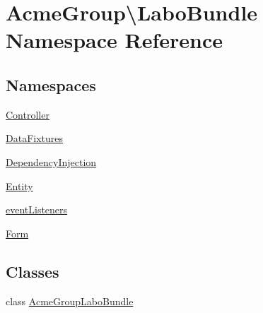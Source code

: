 \hypertarget{namespace_acme_group_1_1_labo_bundle}{\section{Acme\+Group\textbackslash{}Labo\+Bundle Namespace Reference}
\label{namespace_acme_group_1_1_labo_bundle}
}
\subsection*{Namespaces}
\begin{DoxyCompactItemize}
\item 
 \hyperlink{namespace_acme_group_1_1_labo_bundle_1_1_controller}{Controller}
\item 
 \hyperlink{namespace_acme_group_1_1_labo_bundle_1_1_data_fixtures}{Data\+Fixtures}
\item 
 \hyperlink{namespace_acme_group_1_1_labo_bundle_1_1_dependency_injection}{Dependency\+Injection}
\item 
 \hyperlink{namespace_acme_group_1_1_labo_bundle_1_1_entity}{Entity}
\item 
 \hyperlink{namespace_acme_group_1_1_labo_bundle_1_1event_listeners}{event\+Listeners}
\item 
 \hyperlink{namespace_acme_group_1_1_labo_bundle_1_1_form}{Form}
\end{DoxyCompactItemize}
\subsection*{Classes}
\begin{DoxyCompactItemize}
\item 
class \hyperlink{class_acme_group_1_1_labo_bundle_1_1_acme_group_labo_bundle}{Acme\+Group\+Labo\+Bundle}
\end{DoxyCompactItemize}
